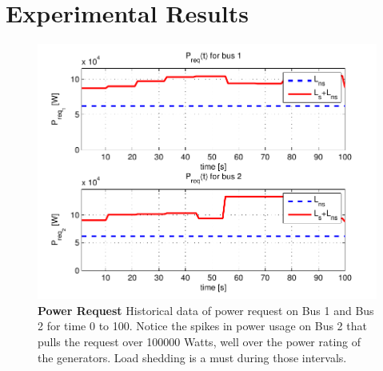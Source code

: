 \documentclass{acm_proc_article-sp}
\begin{document}
\section{Experimental Results}
\label{sec:results}
\begin{figure}[htb]
  \centering
  \includegraphics[width=\columnwidth]{figures/preqnofail}
  \caption{\textbf{Power Request}
  Historical data of power request on Bus 1 and Bus 2 for time 0
  to 100. Notice the spikes in power usage on Bus 2 that pulls the
  request over 100000 Watts, well over the power rating of the generators.
  Load shedding is a must during those intervals.}
  \label{fig:preqnofail}
\end{figure}
\end{document}
